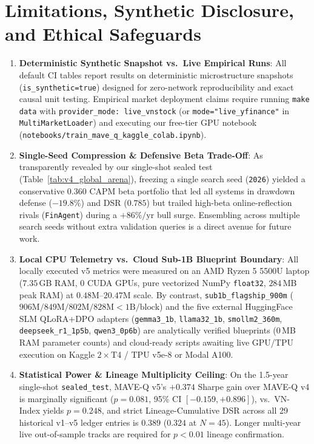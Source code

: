 \documentclass[11pt]{article}
\begin{document}
\section{Limitations, Synthetic Disclosure, and Ethical Safeguards}
\label{sec:limitations}
\begin{enumerate}[leftmargin=1.4em]
  \item \textbf{Deterministic Synthetic Snapshot vs.\ Live Empirical Runs}: All default CI tables report results on deterministic microstructure snapshots (\texttt{is\_synthetic=true}) designed for zero-network reproducibility and exact causal unit testing. Empirical market deployment claims require running \texttt{make data} with \texttt{provider\_mode: live\_vnstock} (or \texttt{mode="live\_yfinance"} in \texttt{MultiMarketLoader}) and executing our free-tier GPU notebook (\texttt{notebooks/train\_mave\_q\_kaggle\_colab.ipynb}).
  \item \textbf{Single-Seed Compression \& Defensive Beta Trade-Off}: As transparently revealed by our single-shot sealed test (Table~\ref{tab:v4_global_arena}), freezing a single search seed (\texttt{2026}) yielded a conservative $0.360$ CAPM beta portfolio that led all systems in drawdown defense ($-19.8\%$) and DSR ($0.785$) but trailed high-beta online-reflection rivals (\texttt{FinAgent}) during a $+86\%/\text{yr}$ bull surge. Ensembling across multiple search seeds without extra validation queries is a direct avenue for future work.
  \item \textbf{Local CPU Telemetry vs.\ Cloud Sub-1B Blueprint Boundary}: All locally executed v5 metrics were measured on an AMD Ryzen 5 5500U laptop ($7.35$\,GB RAM, $0$ CUDA GPUs, pure vectorized NumPy \texttt{float32}, $284$\,MB peak RAM) at $0.48\text{M}$--$20.47\text{M}$ scale. By contrast, \texttt{sub1b\_flagship\_900m} ($906\text{M}/849\text{M}/802\text{M}/828\text{M} < 1\text{B}/\text{block}$) and the five external HuggingFace SLM QLoRA+DPO adapters (\texttt{gemma3\_1b}, \texttt{llama32\_1b}, \texttt{smollm2\_360m}, \texttt{deepseek\_r1\_1p5b}, \texttt{qwen3\_0p6b}) are analytically verified blueprints ($0$\,MB RAM parameter counts) and cloud-ready scripts awaiting live GPU/TPU execution on Kaggle $2\times$T4 / TPU v5e-8 or Modal A100.
  \item \textbf{Statistical Power \& Lineage Multiplicity Ceiling}: On the 1.5-year single-shot \texttt{sealed\_test}, MAVE-Q v5's $+0.374$ Sharpe gain over MAVE-Q v4 is marginally significant ($p=0.081$, 95\% CI $[-0.159, +0.896]$), vs.\ VN-Index yields $p=0.248$, and strict Lineage-Cumulative DSR across all 29 historical v1--v5 ledger entries is $0.389$ ($0.324$ at $N=45$). Longer multi-year live out-of-sample tracks are required for $p < 0.01$ lineage confirmation.

\end{enumerate}
\end{document}

